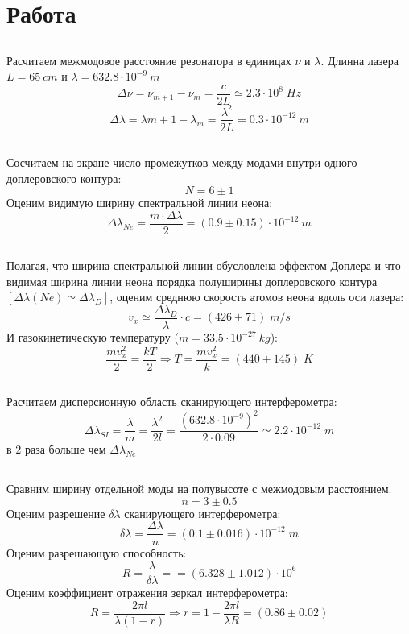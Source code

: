 \documentclass{article}
\begin{document}
\section{Работа}
\subsection{}
Расчитаем межмодовое расстояние резонатора в единицах \(\nu\) и \(\lambda\). Длинна лазера \(L = 65\:cm\)
и \(\lambda = 632.8\cdot 10^{-9}\:m \)
\[ \Delta\nu = \nu_{m+1} - \nu_m = \frac{c}{2L} \simeq 2.3\cdot10^8\; Hz\]
\[ \Delta\lambda = \lambda{m+1} - \lambda_m = \frac{\lambda^2}{2L} = 0.3\cdot 10^{-12}\:m \]

\subsection{}
Сосчитаем на экране число промежутков между модами внутри одного доплеровского контура:
\[ N = 6 \pm 1 \]
Оценим видимую ширину спектральной линии неона:
\[ \Delta\lambda_{Ne} = \frac{m\cdot\Delta\lambda }{2} = \left( 0.9 \pm 0.15  \right)\cdot 10^{-12}\:m \]  

\subsection{}
Полагая, что ширина спектральной линии обусловлена эффектом Доплера и что видимая ширина линии неона
порядка полуширины доплеровского контура 
\(\left[\Delta\lambda\left(Ne\right) \simeq \Delta\lambda_D\right]\), оценим среднюю скорость атомов 
неона вдоль оси лазера:
\[ v_x \simeq \frac{\Delta\lambda_D}{\lambda}\cdot c = \left( 426 \pm 71 \right)\; m/s \]
И газокинетическую температуру (\( m = 33.5\cdot 10^{-27}\: kg\)):
\[ \frac{mv_x^2}{2} = \frac{kT}{2} \Rightarrow T = \frac{mv_x^2}{k} =  \left(440 \pm 145 \right)\;K  \]

\subsection{}
Расчитаем дисперсионную область сканирующего интерферометра:
\[ \Delta\lambda_{SI} = \frac{\lambda}{m} = \frac{\lambda^2}{2l} = 
\frac{\left(632.8\cdot 10^{-9}\right)^2}{2 \cdot 0.09} \simeq 2.2\cdot 10^{-12}\;m  \]
в 2 раза больше чем \(\Delta\lambda_{Ne}\)

\subsection{}
Сравним ширину отдельной моды на полувысоте с межмодовым расстоянием. 
\[ n = 3 \pm 0.5 \]
Оценим разрешение \(\delta\lambda\) сканирующего интерферометра:
\[ \delta\lambda = \frac{\Delta\lambda}{n} = \left(0.1 \pm 0.016\right)\cdot 10^{-12}\;m \]
Оценим разрешающую способность:
\[ R = \frac{\lambda}{\delta\lambda} = = \left(6.328 \pm 1.012 \right)\cdot 10^6 \]
Оценим коэффициент отражения  зеркал интерферометра:
\[ R = \frac{2\pi l}{\lambda(1-r)} \Rightarrow r = 1 - \frac{2\pi l}{\lambda R} = \left(0.86 \pm 0.02 \right) \]
\end{document}
